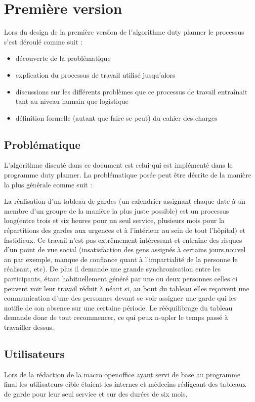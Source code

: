 \documentclass[11pt]{report}
\begin{document}
\section{Première version}
Lors du design de la première version de l'algorithme duty planner le processus s'est déroulé comme suit : 
\begin{itemize}
\item découverte de la problématique
\item explication du processus de travail utilisé jusqu'alors
\item discussions sur les différents problèmes que ce processus de travail entraînait tant au niveau humain que logistique
\item définition formelle (autant que faire se peut) du cahier des charges
\end{itemize}

\subsection{Problématique}
L'algorithme discuté dans ce document est celui qui est implémenté dans le programme duty planner. 
La problématique posée peut être décrite de la manière la plus générale comme suit : 

La réalisation d'un tableau de gardes (un calendrier assignant chaque date à un membre d'un groupe de la manière la plus juste possible) est un processus long(entre trois et six heures pour un seul service, plusieurs mois pour la répartitions des gardes aux urgences et à l'intérieur au sein de tout l'hôpital) et fastidieux. Ce travail n'est pas extrêmement intéressant et entraîne des risques d'un point de vue social (insatisfaction des gens assignés à certains jours,nouvel an par exemple, manque de confiance quant à l'impartialité de la personne le réalisant, etc). 
De plus il demande une grande synchronisation entre les participants, étant habituellement généré par une ou deux personnes celles ci peuvent voir leur travail réduit à néant si, au bout du tableau elles reçoivent une communication d'une des personnes devant se voir assigner une garde qui les notifie de son absence sur une certaine période. Le rééquilibrage du tableau demande donc de tout recommencer, ce qui peux n-upler le temps passé à travailler dessus.

\subsection{Utilisateurs}
Lors de la rédaction de la macro openoffice ayant servi de base au programme final les utilisateurs cible étaient les internes et médecins rédigeant des tableaux de garde pour leur seul service et sur des durées de six mois.
\end{document}
